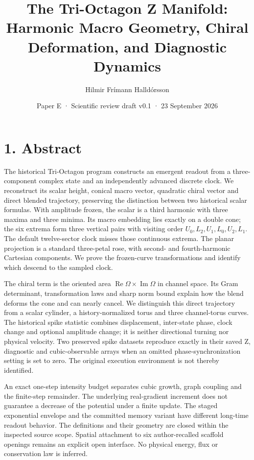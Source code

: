 \documentclass[
  11pt,
  a4paper,
]{article}
\title{The Tri-Octagon Z Manifold: Harmonic Macro Geometry, Chiral Deformation, and Diagnostic Dynamics}
\author{Hilmir Frímann Halldórsson}
\date{Paper E · Scientific review draft v0.1 · 23 September 2026}
\begin{document}
\maketitle

\section{1. Abstract}\label{abstract}

The historical Tri-Octagon program constructs an emergent readout from a three-component complex state and an independently advanced discrete clock. We reconstruct its scalar height, conical macro vector, quadratic chiral vector and direct blended trajectory, preserving the distinction between two historical scalar formulas. With amplitude frozen, the scalar is a third harmonic with three maxima and three minima. Its macro embedding lies exactly on a double cone; the six extrema form three vertical pairs with visiting order \(U_0,L_2,U_1,L_0,U_2,L_1\). The default twelve-sector clock misses those continuous extrema. The planar projection is a standard three-petal rose, with second- and fourth-harmonic Cartesian components. We prove the frozen-curve transformations and identify which descend to the sampled clock.

The chiral term is the oriented area \(\operatorname{Re}\Omega\times\operatorname{Im}\Omega\) in channel space. Its Gram determinant, transformation laws and sharp norm bound explain how the blend deforms the cone and can nearly cancel. We distinguish this direct trajectory from a scalar cylinder, a history-normalized torus and three channel-torus curves. The historical spike statistic combines displacement, inter-state phase, clock change and optional amplitude change; it is neither directional turning nor physical velocity. Two preserved spike datasets reproduce exactly in their saved Z, diagnostic and cubic-observable arrays when an omitted phase-synchronization setting is set to zero. The original execution environment is not thereby identified.

An exact one-step intensity budget separates cubic growth, graph coupling and the finite-step remainder. The underlying real-gradient increment does not guarantee a decrease of the potential under a finite update. The staged exponential envelope and the committed memory variant have different long-time readout behavior. The definitions and their geometry are closed within the inspected source scope. Spatial attachment to six author-recalled scaffold openings remains an explicit open interface. No physical energy, flux or conservation law is inferred.
\end{document}
